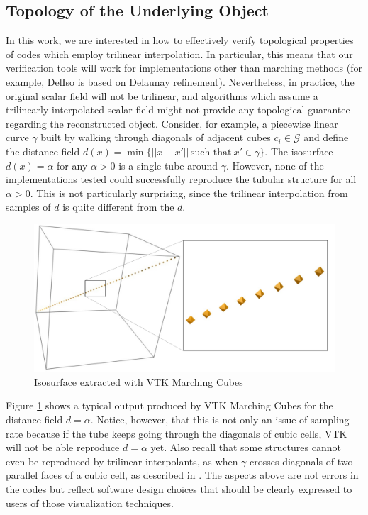 \subsection{Topology of the Underlying Object}
In this work, we are interested in how to effectively verify
topological properties of codes which employ trilinear
interpolation. In particular, this means that our verification tools
will work for implementations other than marching methods (for
example, DelIso is based on Delaunay refinement).
%
Nevertheless, in practice, the original scalar field will not be
trilinear, and algorithms which assume a trilinearly interpolated
scalar field might not provide any topological guarantee regarding the
reconstructed object.
Consider, for example, a piecewise linear curve $\gamma$ built by
walking through diagonals of adjacent cubes $c_i \in \mathcal{G}$ and
define the distance field $d(x) = \min\{||x - x'||\, \text{such
  that}\ x'\in\gamma\}$. The isosurface $d(x) = \alpha$ for any
$\alpha > 0$ is a single tube around $\gamma$.  However, none of the
implementations tested could successfully reproduce the tubular
structure for all $\alpha > 0$. This is not particularly surprising,
since the trilinear interpolation from samples of $d$ is quite
different from the $d$.
\begin{figure}[b]
\centering
\includegraphics[width=0.4\linewidth]{chapter3/figures/distance-field.pdf}
\caption{\label{fig:chap4:vtk} Isosurface extracted with VTK Marching Cubes}
\end{figure}
Figure \ref{fig:chap4:vtk} shows a typical output produced by VTK
Marching Cubes for the distance field $d = \alpha$. Notice, however,
that this is not only an issue of sampling rate because if the tube
keeps going through the diagonals of cubic cells, VTK will not be able
reproduce $d = \alpha$ yet.  Also recall that some structures cannot
even be reproduced by trilinear interpolants, as when
$\gamma$ crosses diagonals of two parallel faces of a cubic cell, as
described in \cite{Chernyaev95marchingcubes, Pascucci03}.  The aspects
above are not errors in the codes but reflect software design choices
that should be clearly expressed to users of those visualization
techniques.

